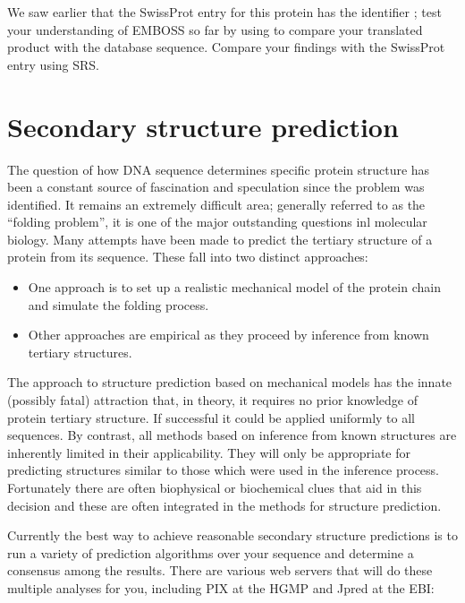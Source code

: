 \documentclass[12pt]{report}
\begin{document}
We saw earlier that the SwissProt entry for this protein has the 
identifier ; test your understanding of EMBOSS so 
far by using  to compare your translated product with 
the database sequence. Compare your findings with the SwissProt
 entry using SRS.

\section{Secondary structure prediction}

The question of how DNA sequence determines specific protein structure
has been a constant source of fascination and speculation since the
problem was identified. It remains an extremely difficult area;
generally referred to as the ``folding problem'', it is one of the major
outstanding questions inl molecular biology. Many attempts
have been made to predict the tertiary structure of a protein from its
sequence. These fall into two distinct approaches:

\begin{itemize}
\item One approach is to set up a realistic mechanical model of
the protein chain and simulate the
folding process.  
\item Other approaches are empirical as they proceed by inference
from known tertiary structures. 
\end{itemize}

The approach to structure prediction based on mechanical models has
the innate (possibly fatal) attraction that, in theory, it requires no
prior knowledge of protein tertiary structure. If successful it could
be applied uniformly to all sequences. By contrast, all methods based
on inference from known structures are inherently limited in their
applicability. They will only be appropriate for predicting structures
similar to those which were used in the inference process.
Fortunately there are often biophysical or biochemical clues that aid
in this decision and these are often integrated in the methods for
structure prediction.

Currently the best way to achieve reasonable secondary structure
predictions is to run a variety of prediction algorithms over your
sequence and determine a consensus among the results. There are
various web servers that will do these multiple analyses for you,
including PIX at the HGMP and Jpred at the EBI:

\noindent{}\\
\end{document}
